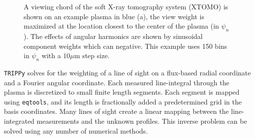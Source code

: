 \documentclass{elsarticle}
\newcommand{\eqtools}{\texttt{eqtools}\xspace}
\newcommand{\TRIPPy}{\texttt{TRIPPy}\xspace}
\begin{document}
\begin{figure}
	\caption{A viewing chord of the soft X-ray tomography system (XTOMO) is shown on an example plasma in blue (a), the view weight is maximized at the location closest to the center of the plasma (in $\psi_n$). The effects of angular harmonics are shown by sinusoidal component weights which can negative. This example uses 150 bins in $\psi_n$ with a $10 \mu$m step size.}
	\label{fig:TRIPPydemo}
\end{figure}


\TRIPPy solves for the weighting of a line of sight on a flux-based radial coordinate and a Fourier angular coordinate.
Each measured line-integral through the plasma is discretized to small finite length segments.
Each segment is mapped using \eqtools, and its length is fractionally added a predetermined grid in the basis coordinates.
Many lines of sight create a linear mapping between the line-integrated measurements and the unknown profiles.
This inverse problem can be solved using any number of numerical methods.
\end{document}
